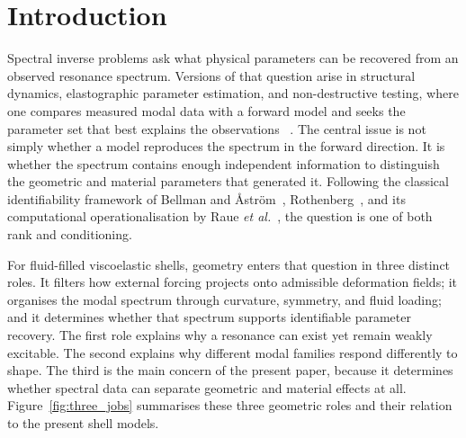 
\section{Introduction}
\label{sec:introduction}

Spectral inverse problems ask what physical parameters can be recovered from an
observed resonance spectrum.  Versions of that question arise in structural
dynamics, elastographic parameter estimation, and non-destructive testing,
where one compares measured modal data with a forward model and seeks the
parameter set that best explains the observations
~\cite{Gladwell2004,Gladwell2005,MottersheadFriswell1993,FriswellMottershead1995,Doyley2012}.
The central issue is not simply whether a model reproduces the spectrum in the
forward direction.  It is whether the spectrum contains enough independent
information to distinguish the geometric and material parameters that generated
it.  Following the classical identifiability framework of Bellman and
{\AA}str{\"o}m~\cite{BellmanAstrom1970}, Rothenberg~\cite{Rothenberg1971}, and
its computational operationalisation by Raue \emph{et al.}~\cite{Raue2009}, the
question is one of both rank and conditioning.

For fluid-filled viscoelastic shells, geometry enters that question in three
distinct roles.  It filters how external forcing projects onto admissible
deformation fields; it organises the modal spectrum through curvature,
symmetry, and fluid loading; and it determines whether that spectrum supports
identifiable parameter recovery.  The first role explains why a resonance can
exist yet remain weakly excitable.  The second explains why different modal
families respond differently to shape.  The third is the main concern of the
present paper, because it determines whether spectral data can separate
geometric and material effects at all.  Figure~\ref{fig:three_jobs} summarises
these three geometric roles and their relation to the present shell models.

